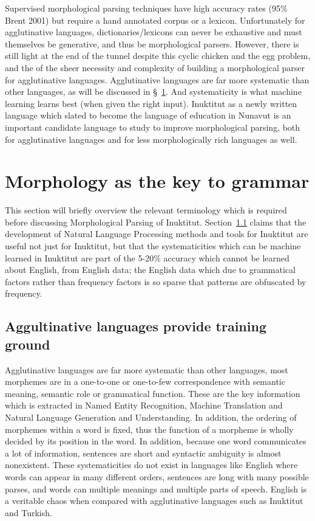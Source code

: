 \documentclass[runningheads,a4paper]{llncs}
\begin{document}
Supervised morphological parsing techniques have high accuracy rates (95\% Brent 2001) but require a hand annotated corpus or a lexicon. Unfortunately for agglutinative languages, dictionaries/lexicons  can never be exhaustive and must themselves be generative, and thus be morphological parsers. However, there is still light at the end of the tunnel despite this cyclic chicken and the egg problem, and the of the sheer necessity and complexity of building a morphological parser for agglutinative languages. Agglutinative languages are far more systematic than other languages, as will be discussed in \S~\ref{morphology}. And systematicity is what machine learning learns best (when given the right input). Inuktitut as a newly written language which slated to become the language of education in Nunavut is an important candidate language to study to improve morphological parsing, both for agglutinative languages and for less morphologically rich languages as well.

\section{Morphology as the key to grammar}
\label{morphology}
This section will briefly overview the relevant terminology which is required before discussing Morphological Parsing of Inuktitut. Section~\ref{sec:agglutinativebenefits} claims that the development of Natural Language Processing methods and tools for Inuktitut are useful not just for Inuktitut, but that the systematicities which can be machine learned in Inuktitut are part of the 5-20\% accuracy which cannot be learned about English, from English data; the English data which due to grammatical factors rather than frequency factors is so sparse that patterns are obfuscated by frequency. 


\subsection{Aggultinative languages provide training ground}
\label{sec:agglutinativebenefits}

Agglutinative languages are far more systematic than other languages, most morphemes are in a one-to-one or one-to-few correspondence with semantic meaning, semantic role or grammatical function. These are the key information which is extracted in Named Entity Recognition, Machine Translation and Natural Language Generation and Understanding. In addition, the ordering of morphemes within a word is fixed, thus the function of a morpheme is wholly decided by its position in the word. In addition, because one word communicates a lot of information, sentences are short and syntactic ambiguity is almost nonexistent. These systematicities do not exist in languages like English where words can appear in many different orders, sentences are long with many possible parses, and words can multiple meanings and multiple parts of speech. English is a veritable chaos when compared with agglutinative languages such as Inuktitut and Turkish.
\end{document}
